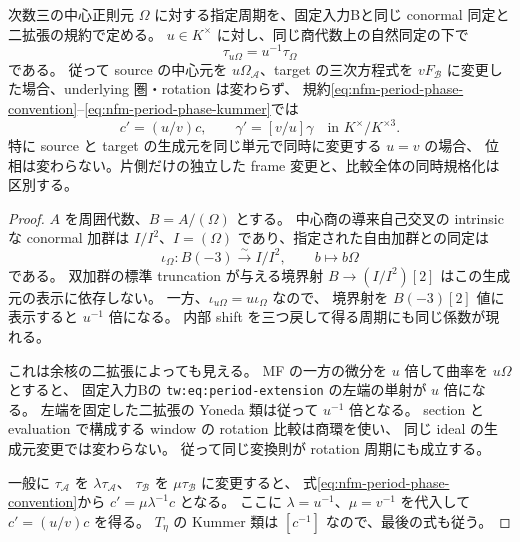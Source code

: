 \begin{proposition}
\label{prop:nfm-period-equation-frame-change}
次数三の中心正則元 $\Omega$ に対する指定周期を、固定入力Bと同じ
conormal 同定と二拡張の規約で定める。
$u\in K^\times$ に対し、同じ商代数上の自然同定の下で
\begin{equation}\label{eq:nfm-period-equation-rescaling}
 \tau_{u\Omega}=u^{-1}\tau_\Omega
\end{equation}
である。
従って source の中心元を $u\Omega_{\mathcal A}$、target の三次方程式を
$vF_{\mathcal B}$ に変更した場合、underlying 圏・rotation は変わらず、
規約\eqref{eq:nfm-period-phase-convention}--\eqref{eq:nfm-period-phase-kummer}では
\begin{equation}\label{eq:nfm-period-phase-frame-law}
 c'=(u/v)c,
 \qquad
 \gamma'=[v/u]\gamma
       \quad\text{in }K^\times/K^{\times3}.
\end{equation}
特に source と target の生成元を同じ単元で同時に変更する $u=v$ の場合、
位相は変わらない。片側だけの独立した frame 変更と、比較全体の同時規格化は区別する。
\end{proposition}

\begin{proof}
$A$ を周囲代数、$B=A/(\Omega)$ とする。
中心商の導来自己交叉の intrinsic な conormal 加群は
$I/I^2$、$I=(\Omega)$ であり、指定された自由加群との同定は
\[
 \iota_\Omega:B(-3)\xrightarrow{\sim}I/I^2,
 \qquad b\longmapsto b\Omega
\]
である。
双加群の標準 truncation が与える境界射
$B\to(I/I^2)[2]$ はこの生成元の表示に依存しない。
一方、$\iota_{u\Omega}=u\iota_\Omega$ なので、
境界射を $B(-3)[2]$ 値に表示すると $u^{-1}$ 倍になる。
内部 shift を三つ戻して得る周期にも同じ係数が現れる。

これは余核の二拡張によっても見える。
MF の一方の微分を $u$ 倍して曲率を $u\Omega$ とすると、
固定入力Bの \texttt{tw:eq:period-extension} の左端の単射が $u$ 倍になる。
左端を固定した二拡張の Yoneda 類は従って $u^{-1}$ 倍となる。
section と evaluation で構成する window の rotation 比較は商環を使い、
同じ ideal の生成元変更では変わらない。
従って同じ変換則が rotation 周期にも成立する。

一般に $\tau_{\mathcal A}$ を $\lambda\tau_{\mathcal A}$、
$\tau_{\mathcal B}$ を $\mu\tau_{\mathcal B}$ に変更すると、
式\eqref{eq:nfm-period-phase-convention}から $c'=\mu\lambda^{-1}c$ となる。
ここに $\lambda=u^{-1}$、$\mu=v^{-1}$ を代入して
$c'=(u/v)c$ を得る。
$T_\eta$ の Kummer 類は $[c^{-1}]$ なので、最後の式も従う。
\end{proof}


